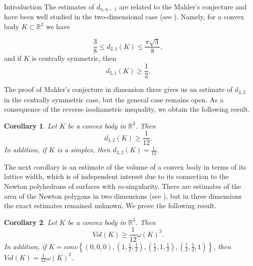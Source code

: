 \documentclass[12pt]{article}
\newcommand\R{\mathbb R}
\newtheorem{Corollary}{Corollary}[section]
\begin{document}
\begin{section}{Introduction}
    The estimates of $d_{n,n-1}$ are related to the Mahler's conjecture and have been well studied in the two-dimensional case (see \cite{ makai2016, AAA23}). Namely, for a convex body $K\subset \mathbb{R}^2$ we have
    
        $$
            \frac{3}{8}\leq d_{2,1}(K)\leq\frac{\pi \sqrt{3}}{8}, $$ 
    and if $K$ is centrally symmetric, then 
    $$
        d_{2,1}(K)\geq \frac{1}{2}.
    $$
    
    The proof of Mahler's conjecture in dimension three gives us an estimate of $d_{3,2}$ in the centrally symmetric case, but the general case remains open. As a consequence of the reverse isodiametric inequality, we obtain the following result.
    \begin{Corollary}
    \label{d32}
         Let $K$ be a convex body in $\R^{3}$. Then 
         $$
            d_{3,2}(K)\geq \frac{1}{12}.
         $$
    In addition, if $K$ is a simplex, then $d_{3,2}(K) = \frac{1}{12}.$
    \end{Corollary}

    The next corollary is an estimate of the volume of a  convex body in terms of its lattice width, which is of independent interest due to its connection to the Newton 
polyhedrons of surfaces with $m$-singularity. There are estimates of the area of the Newton polygons in two dimensions (see \cite{nk1,nk2}), but in three dimensions the exact estimates remained unknown. We prove the following result.  
    \begin{Corollary}
    \label{lattice-width}
        Let $K$ be a convex body in $\R^{3}$. Then 
         $$
            Vol(K)\geq \frac{1}{12}\omega(K)^3.
         $$
    In addition, if $K = conv\left\{(0,0,0),  \left(1,\frac{1}{2},\frac{1}{2}\right),\left(\frac{1}{2},1,\frac{1}{2}\right),\left(\frac{1}{2},\frac{1}{2},1\right)\right\}$, then $Vol(K) = \frac{1}{12}\omega(K)^3.$
    \end{Corollary}

    

    
        
\end{section}
\end{document}
